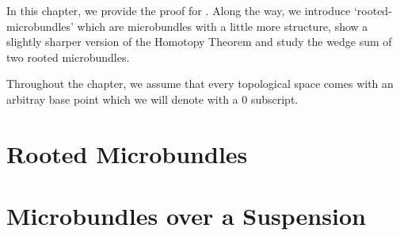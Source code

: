 \begin{myparagraph}
    In this chapter, we provide the proof for .
    Along the way, we introduce `rooted-microbundles' which are
    microbundles with a little more structure, show a slightly sharper version of
    the Homotopy Theorem and study the wedge sum of two rooted microbundles.

    Throughout the chapter,
    we assume that every topological space comes with an arbitray base point which
    we will denote with a $0$ subscript.
\end{myparagraph}
\section{Rooted Microbundles}\label{section::rooted}




\section{Microbundles over a Suspension}\label{section::suspension}




